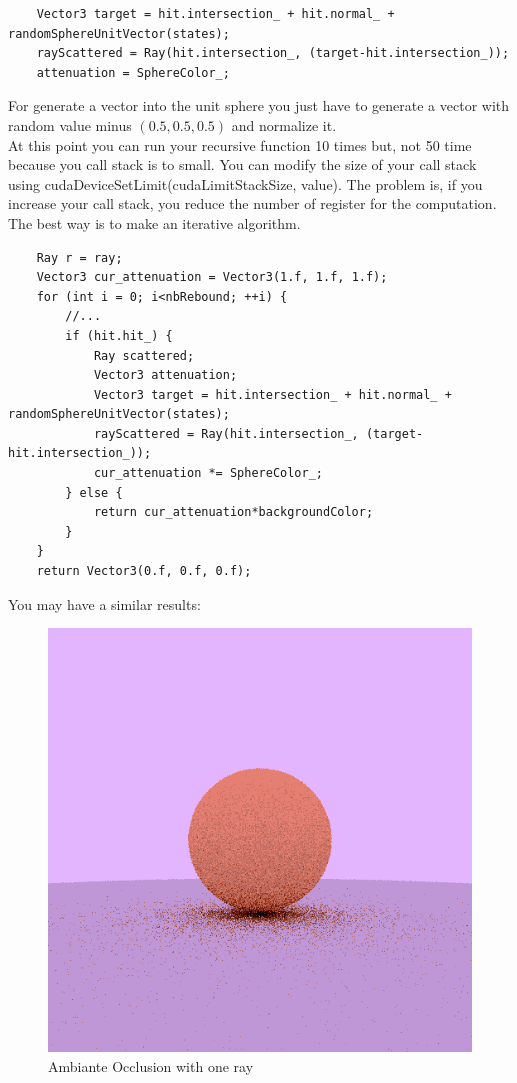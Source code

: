 \documentclass{article}
\begin{document}
\begin{lstlisting}
	Vector3 target = hit.intersection_ + hit.normal_ + randomSphereUnitVector(states);
	rayScattered = Ray(hit.intersection_, (target-hit.intersection_));
	attenuation = SphereColor_;
\end{lstlisting}

For generate a vector into the unit sphere you just have to generate a vector with random value minus $(0.5, 0.5, 0.5)$ and normalize it.\\
At this point you can run your recursive function 10 times but, not 50 time because you call stack is to small. You can modify the size of your call stack using cudaDeviceSetLimit(cudaLimitStackSize, value). The problem is, if you increase your call stack, you reduce the number of register for the computation. The best way is to make an iterative algorithm.

\begin{lstlisting}
	Ray r = ray;
	Vector3 cur_attenuation = Vector3(1.f, 1.f, 1.f);
	for (int i = 0; i<nbRebound; ++i) {
		//...
		if (hit.hit_) {
			Ray scattered;
			Vector3 attenuation;
			Vector3 target = hit.intersection_ + hit.normal_ + randomSphereUnitVector(states);
			rayScattered = Ray(hit.intersection_, (target-hit.intersection_));
			cur_attenuation *= SphereColor_;
		} else {
			return cur_attenuation*backgroundColor;
		}
	}
	return Vector3(0.f, 0.f, 0.f);
\end{lstlisting}
You may have a similar results:
\begin{figure}[h]
	\centering
	\includegraphics[scale=0.47]{figures/oneRay.png}
	\caption{Ambiante Occlusion with one ray}
\end{figure}
\end{document}
